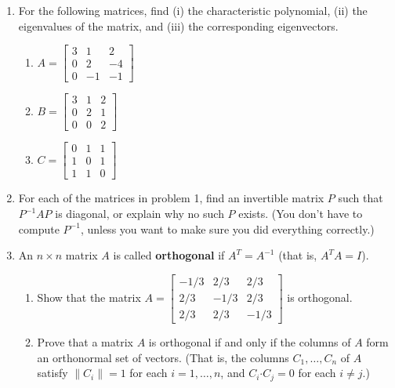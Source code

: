 \documentclass[12pt]{article}
\newcommand{\len}[1]{\lVert #1\rVert}
\newcommand{\dotp}{\boldsymbol{\cdot}}
\newcommand{\bbm}{\begin{bmatrix}}
\newcommand{\ebm}{\end{bmatrix}}
\begin{document}
\thispagestyle{fancy}

 \begin{enumerate}
  \item For the following matrices, find (i) the characteristic polynomial, (ii) the eigenvalues of the matrix, and (iii) the corresponding eigenvectors.
\begin{multicols}{3}

\begin{enumerate}
  \item $A = \bbm 3& 1&2\\0&2&-4\\0& -1&-1\ebm$
  \item $B = \bbm 3 & 1 & 2\\0& 2 & 1\\0& 0& 2\ebm$
  \item $C = \bbm 0&1&1\\1&0&1\\1&1&0\ebm$
 \end{enumerate}
\end{multicols}
\item For each of the matrices in problem 1, find an invertible matrix $P$ such that $P^{-1}AP$ is diagonal, or explain why no such $P$ exists. (You don't have to compute $P^{-1}$, unless you want to make sure you did everything correctly.)


\item An $n\times n$ matrix $A$ is called \textbf{orthogonal} if $A^T=A^{-1}$ (that is, $A^TA=I$).
\begin{enumerate}
 \item Show that the matrix $A=\bbm -1/3&2/3&2/3\\2/3&-1/3&2/3\\2/3&2/3&-1/3\ebm$ is orthogonal. 
 \item Prove that a matrix $A$ is orthogonal if and only if the columns of $A$ form an orthonormal set of vectors. (That is, the columns $C_1,\ldots, C_n$ of $A$ satisfy $\len{C_i}=1$ for each $i=1,\ldots, n$, and $C_i\dotp C_j = 0$ for each $i\neq j$.) 
\end{enumerate}


\end{enumerate}
\end{document}
